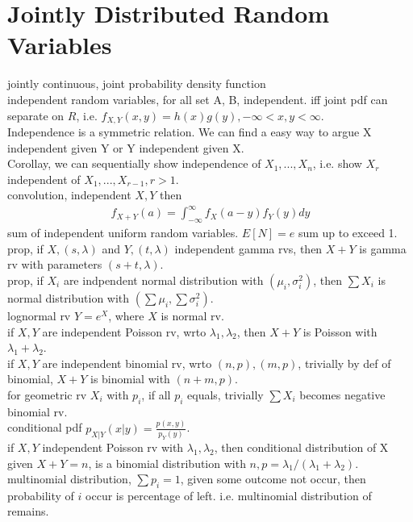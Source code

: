 \documentclass[paper=a4, fontsize=11pt]{scrartcl} %
\numberwithin{equation}{section} %
\numberwithin{figure}{section} %
\numberwithin{table}{section} %
\begin{document}
\section{Jointly Distributed Random Variables}
jointly continuous, joint probability density function\\
independent random variables, for all set A, B, independent. iff joint pdf can separate on $R$, i.e. $f_{X,Y}(x,y) = h(x)g(y), -\infty<x,y<\infty$.\\
Independence is a symmetric relation. We can find a easy way to argue X independent given Y or Y independent given X.\\
Corollay, we can sequentially show independence of $X_1,...,X_n$, i.e. show $X_r$ independent of $X_1,...,X_{r-1}, r>1$.\\
convolution, independent $X,Y$ then
\begin{align}
	 f_{X+Y}(a) = \int_{-\infty}^\infty f_X(a-y)f_Y(y)dy
\end{align}
sum of independent uniform random variables. $E[N]=e$ sum up to exceed 1.\\
prop, if $X,(s,\lambda)$ and $Y,(t,\lambda)$ independent gamma rvs, then $X+Y$ is gamma rv with parameters $(s+t,\lambda)$.\\
prop, if $X_i$ are indpendent normal distribution with $(\mu_i,\sigma_i^2)$, then $\sum X_i$ is normal distribution with $(\sum \mu_i, \sum \sigma_i^2)$.\\
lognormal rv $Y=e^X$, where $X$ is normal rv.\\
if $X,Y$ are independent Poisson rv, wrto $\lambda_1,\lambda_2$, then $X+Y$ is Poisson with $\lambda_1+\lambda_2$.\\
if $X,Y$ are independent binomial rv, wrto $(n,p),(m,p)$, trivially by def of binomial, $X+Y$ is binomial with $(n+m,p)$.\\
for geometric rv $X_i$ with $p_i$, if all $p_i$ equals, trivially $\sum X_i$ becomes negative binomial rv.\\
conditional pdf $p_{X|Y}(x|y) = \frac{p(x,y)}{p_Y(y)}$.\\
if $X,Y$ independent Poisson rv with $\lambda_1,\lambda_2$, then conditional distribution of X given $X+Y=n$, is a binomial distribution with $n,p=\lambda_1/(\lambda_1+\lambda_2)$.\\
multinomial distribution, $\sum p_i=1$, given some outcome not occur, then probability of $i$ occur is percentage of left. i.e. multinomial distribution of remains.\\
\end{document}
